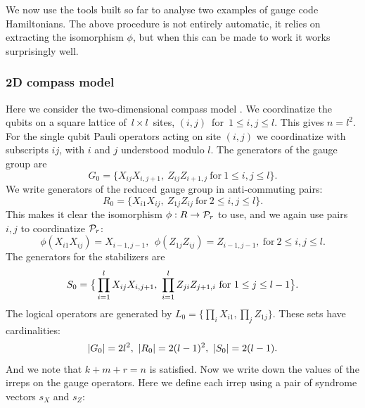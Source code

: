 We now use the tools built so far
to analyse two examples of gauge code Hamiltonians.
The above procedure is not entirely automatic,
it relies on extracting the isomorphism $\phi$,
but when this can be made to work it works surprisingly well.

%
%

\subsubsection{2D compass model}

Here we consider the two-dimensional compass model \cite{Bacon2006}.
We coordinatize the qubits on a square 
lattice of\ $l\times l$\ sites,
$(i, j)$\ for\ $1\le i, j\le l.$
This gives $n = l^2.$
For the single qubit Pauli operators acting on site
$(i, j)$ we coordinatize with subscripts $ij$, 
with $i$ and $j$ understood modulo $l$.
The generators of the gauge group are
$$
    G_0 = \big\{ X_{ij}X_{i,j+1},\ Z_{ij}Z_{i+1,j}\ \mbox{for}\ 1\le i, j\le l\big\}.
$$
We write generators of the reduced
gauge group in anti-commuting pairs:
$$
    R_0 = \big\{ X_{i1}X_{ij},\ Z_{1j}Z_{ij}\ \mbox{for}\ 2\le i, j\le l\big\}.
$$
This makes it clear the isomorphism $\phi : R \to \mathcal{P}_r$ to use,
and we again use pairs $i,j$ to coordinatize $\mathcal{P}_r$:
$$
    \phi(X_{i1}X_{ij}) = X_{i-1,j-1}, \ \ \phi(Z_{1j}Z_{ij}) = Z_{i-1,j-1},\ \mbox{for}\ 2\le i, j\le l.
$$
The generators for the stabilizers are
$$
    \Stab_0 = \big\{ \prod_{i=1}^l X_{ij}X_{i,j+1},\ \prod_{i=1}^l Z_{ji}Z_{j+1,i}\ \mbox{for}\ 1\le j\le l-1\big\}.
$$
The logical operators are generated by $L_0 = \big\{ \prod_i X_{i1}, \prod_j Z_{1j} \}.$
These sets have cardinalities:
$$|G_0|=2l^2,\ |R_0| = 2(l-1)^2,\ |\Stab_0| = 2(l-1).$$
And we note that $k+m+r=n$ is satisfied.
Now we write down the values of the
irreps on the gauge operators.
Here we define each irrep using a pair 
of syndrome vectors $s_X$ and $s_Z:$
